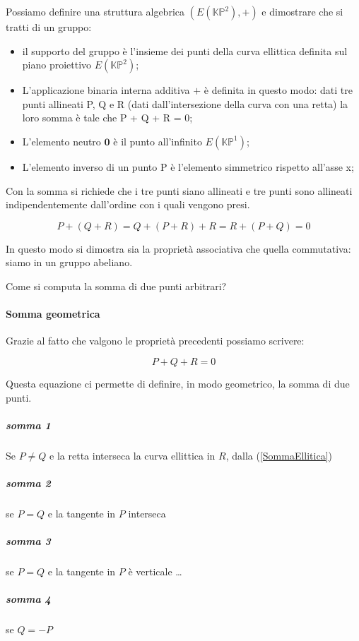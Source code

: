 \documentclass{book}
\theoremstyle{definition}
\begin{document}
Possiamo definire una struttura algebrica $(E(\mathbb{KP}^2), +)$ e dimostrare che si tratti di un gruppo:

\begin{itemize}
    \item il supporto del gruppo è l'insieme dei punti della curva ellittica definita sul piano proiettivo $E(\mathbb{KP}^2)$;
    \item L'applicazione binaria interna additiva $+$ è definita in questo modo: dati tre punti allineati P, Q e R (dati dall'intersezione della curva con una retta) la loro somma è tale che P + Q + R = 0;
    \item L'elemento neutro $\mathbf{0}$ è il punto all'infinito ${E(\mathbb{KP}^{1})}$;
    \item L'elemento inverso di un punto P è l'elemento simmetrico rispetto all'asse x;
\end{itemize}

Con la somma si richiede che i tre punti siano allineati e tre punti sono allineati indipendentemente dall'ordine con i quali vengono presi.

\[
    P + ( Q + R ) = Q + ( P + R ) + R = R + ( P + Q ) = 0
\]

In questo modo si dimostra sia la proprietà associativa che quella commutativa: siamo in un gruppo abeliano.

Come si computa la somma di due punti arbitrari?

\paragraph{Somma geometrica}

Grazie al fatto che valgono le proprietà precedenti possiamo scrivere:

\begin{equation}
    \label{SommaEllitica}
    P + Q + R = 0
\end{equation}

Questa equazione ci permette di definire, in modo geometrico, la somma di due punti.

\subparagraph{somma 1}
Se $P \neq Q$ e la retta interseca la curva ellittica in $R$, dalla (\ref{SommaEllitica})

\subparagraph{somma 2}
se $P = Q$ e la tangente in $P$ interseca

\subparagraph{somma 3}
se $P = Q$ e la tangente in $P$ è verticale \dots

\subparagraph{somma 4}

se $Q = -P$
\end{document}
